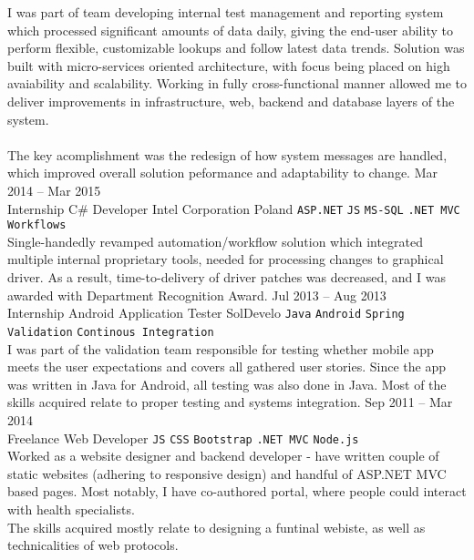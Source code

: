 \documentclass[9pt]{style/developercv}
\begin{document}
\begin{entrylist}
{			I was part of team developing internal test management and reporting 
			system which processed significant amounts of data daily, giving 
			the end-user ability to perform flexible, customizable lookups
			and follow latest data trends.
			Solution was built with micro-services oriented architecture, with 
			focus being placed on high avaiability and scalability.
			Working in fully cross-functional manner allowed me to deliver 
			improvements in infrastructure, web, backend and database layers 
			of the system.\\ \\
			The key acomplishment was the redesign of how system messages are 
			handled, which improved overall solution peformance and adaptability to
			change.
		}
	\entry
		{Mar 2014 -- Mar 2015\\\footnotesize{Internship}}
		{C\# Developer}
		{Intel Corporation Poland}
		{
			\texttt{ASP.NET}\slashsep
			\texttt{JS}\slashsep
			\texttt{MS-SQL}\slashsep
			\texttt{.NET MVC}\slashsep
			\texttt{Workflows}\\

			Single-handedly revamped automation/workflow solution which integrated
			multiple internal proprietary tools, needed for processing changes to 
			graphical driver. As a result, time-to-delivery of driver patches was 
			decreased, and I was awarded with Department Recognition Award.
		}
	\entry
		{Jul 2013 -- Aug 2013\\\footnotesize{Internship}}
		{Android Application Tester}
		{SolDevelo}
		{
			\texttt{Java}\slashsep
			\texttt{Android}\slashsep
			\texttt{Spring}\slashsep
			\texttt{Validation}\slashsep
			\texttt{Continous Integration}\\

			I was part of the validation team responsible for testing whether 
			mobile app meets the user expectations and covers all gathered user 
			stories. Since the app was written in  Java for Android, all testing 
			was also done in Java. Most of the skills acquired relate to proper 
			testing and systems integration.
		}
	\entry
		{Sep 2011 -- Mar 2014\\\footnotesize{Freelance}}
		{Web Developer}
		{}
		{
			\texttt{JS}\slashsep
			\texttt{CSS}\slashsep
			\texttt{Bootstrap}\slashsep
			\texttt{.NET MVC}\slashsep
			\texttt{Node.js}\\

			Worked as a website designer and backend developer - have written 
			couple of static websites (adhering to responsive design) and handful 
			of ASP.NET MVC based pages.	Most notably, I have co-authored portal, 
			where people could interact with health specialists.\\
			The skills acquired mostly relate to designing a funtinal webiste, as 
			well as technicalities of web protocols.
		}
\end{entrylist}
\end{document}
